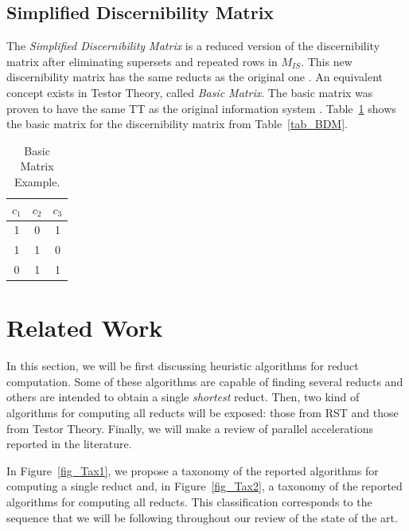 \documentclass[authoryear,11pt]{elsarticle}
\begin{document}
\subsection{Simplified Discernibility Matrix}
  The \textit{Simplified Discernibility Matrix} is a reduced version of the discernibility matrix after
  eliminating supersets and repeated rows in $M_{IS}$. This new discernibility matrix has the same reducts
  as the original one \citep{Yao09}. An equivalent concept exists in Testor Theory, called 
  \textit{Basic Matrix}. The basic matrix was proven to have the same TT as the original information
  system \citep{Lazo01}. Table~\ref{tab_SDM} shows the basic matrix for the
  discernibility matrix from Table~\ref{tab_BDM}.
  
     \begin{table}[htb]
		\caption{Basic Matrix Example.} \label{tab_SDM}
		\centering
 	\begin{tabular}{ccc}
 		$c_1$ & $c_2$ & $c_3$\\
 		\hline
		1 & 0 & 1 \\
		1 & 1 & 0 \\
		0 & 1 & 1
 	\end{tabular}             
 \end{table}

\section{Related Work}\label{relatedWork}
  In this section, we will be first discussing heuristic algorithms for reduct computation. Some of these 
  algorithms are capable of finding several reducts and others are intended to obtain a single \textit{shortest} 
  reduct. Then, two kind of algorithms for computing all reducts will be exposed: those 
  from RST and those from Testor Theory. Finally, we will make a review of parallel accelerations reported in 
  the literature.  
  
  In Figure~\ref{fig_Tax1}, we propose a taxonomy of the reported algorithms for computing a single reduct
  and, in Figure~\ref{fig_Tax2}, a taxonomy of the reported algorithms for computing all reducts. 
  This classification corresponds to the sequence that we will be following throughout our review of the 
  state of the art.
   
\end{document}
